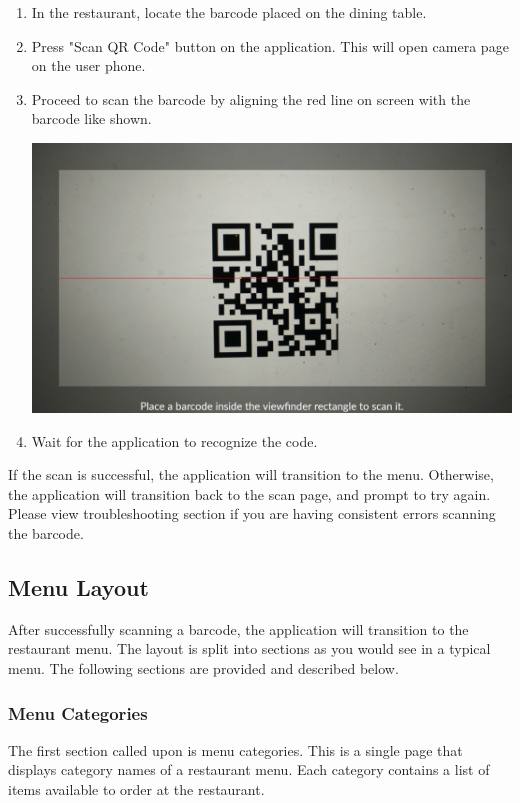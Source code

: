 \documentclass[12pt, titlepage]{article}
\begin{document}
\begin{enumerate}
\item In the restaurant, locate the barcode placed on the dining table.
\item Press "Scan QR Code" button on the application. This will open camera page on the user phone. 
\item Proceed to scan the barcode by aligning the red line on screen with the barcode like shown.
\begin{center}\includegraphics[scale=0.15]{scan.png}\end{center}
\item Wait for the application to recognize the code. 
\end{enumerate}

\noindent If the scan is successful, the application will transition to the menu. Otherwise, the application will transition back to the scan page, and prompt to try again. 
\newline\newline
Please view troubleshooting section if you are having consistent errors scanning the barcode. 

\subsection{Menu Layout}
After successfully scanning a barcode, the application will transition to the restaurant menu. The layout is split into sections as you would see in a typical menu. The following sections are provided and described below.

\subsubsection{Menu Categories}
The first section called upon is menu categories. This is a single page that displays category names of a restaurant menu. Each category contains a list of items available to order at the restaurant.
\end{document}
